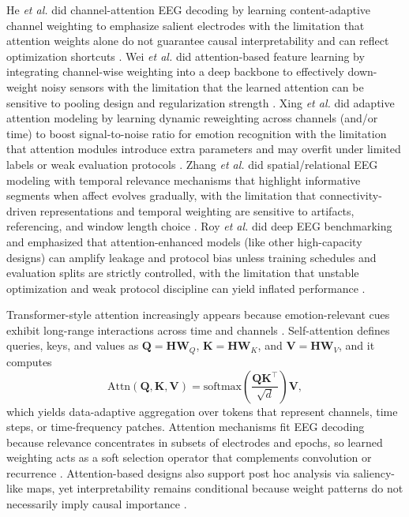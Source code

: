 \documentclass{WileyMSP-template}
\begin{document}
He \textit{et al.} did channel-attention EEG decoding by learning content-adaptive channel weighting to emphasize salient electrodes with the limitation that attention weights alone do not guarantee causal interpretability and can reflect optimization shortcuts \cite{hheand2019channela}. Wei \textit{et al.} did attention-based feature learning by integrating channel-wise weighting into a deep backbone to effectively down-weight noisy sensors with the limitation that the learned attention can be sensitive to pooling design and regularization strength \cite{jweijl2018learning}. Xing \textit{et al.} did adaptive attention modeling by learning dynamic reweighting across channels (and/or time) to boost signal-to-noise ratio for emotion recognition with the limitation that attention modules introduce extra parameters and may overfit under limited labels or weak evaluation protocols \cite{jxingk2018adaptive}. Zhang \textit{et al.} did spatial/relational EEG modeling with temporal relevance mechanisms that highlight informative segments when affect evolves gradually, with the limitation that connectivity-driven representations and temporal weighting are sensitive to artifacts, referencing, and window length choice \cite{tzhang2019spatialt}. Roy \textit{et al.} did deep EEG benchmarking and emphasized that attention-enhanced models (like other high-capacity designs) can amplify leakage and protocol bias unless training schedules and evaluation splits are strictly controlled, with the limitation that unstable optimization and weak protocol discipline can yield inflated performance \cite{yroyhb2019deeplear}.

Transformer-style attention increasingly appears because emotion-relevant cues exhibit long-range interactions across time and channels \cite{hheand2019channela}. Self-attention defines queries, keys, and values as $\mathbf{Q}=\mathbf{H}\mathbf{W}_Q$, $\mathbf{K}=\mathbf{H}\mathbf{W}_K$, and $\mathbf{V}=\mathbf{H}\mathbf{W}_V$, and it computes \begin{equation} \mathrm{Attn}(\mathbf{Q},\mathbf{K},\mathbf{V})=\mathrm{softmax}\!\left(\frac{\mathbf{Q}\mathbf{K}^\top}{\sqrt{d}}\right)\mathbf{V}, \end{equation} which yields data-adaptive aggregation over tokens that represent channels, time steps, or time-frequency patches. Attention mechanisms fit EEG decoding because relevance concentrates in subsets of electrodes and epochs, so learned weighting acts as a soft selection operator that complements convolution or recurrence \cite{sliuxw2020subjecti}. Attention-based designs also support post hoc analysis via saliency-like maps, yet interpretability remains conditional because weight patterns do not necessarily imply causal importance \cite{ctanfs2018asurveyo}.
\end{document}
